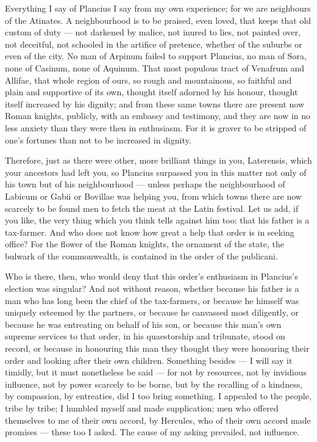  Everything I say of Plancius I say from my own experience; for we are neighbours of the Atinates. A neighbourhood is to be praised, even loved, that keeps that old custom of duty --- not darkened by malice, not inured to lies, not painted over, not deceitful, not schooled in the artifice of pretence, whether of the suburbs or even of the city. No man of Arpinum failed to support Plancius, no man of Sora, none of Casinum, none of Aquinum. That most populous tract of Venafrum and Allifae, that whole region of ours, so rough and mountainous, so faithful and plain and supportive of its own, thought itself adorned by his honour, thought itself increased by his dignity; and from these same towns there are present now Roman knights, publicly, with an embassy and testimony, and they are now in no less anxiety than they were then in enthusiasm. For it is graver to be stripped of one's fortunes than not to be increased in dignity.

 Therefore, just as there were other, more brilliant things in you, Laterensis, which your ancestors had left you, so Plancius surpassed you in this matter not only of his town but of his neighbourhood --- unless perhaps the neighbourhood of Labicum or Gabii or Bovillae was helping you, from which towns there are now scarcely to be found men to fetch the meat at the Latin festival. Let us add, if you like, the very thing which you think tells against him too: that his father is a tax-farmer. And who does not know how great a help that order is in seeking office? For the flower of the Roman knights, the ornament of the state, the bulwark of the commonwealth, is contained in the order of the publicani.

 Who is there, then, who would deny that this order's enthusiasm in Plancius's election was singular? And not without reason, whether because his father is a man who has long been the chief of the tax-farmers, or because he himself was uniquely esteemed by the partners, or because he canvassed most diligently, or because he was entreating on behalf of his son, or because this man's own supreme services to that order, in his quaestorship and tribunate, stood on record, or because in honouring this man they thought they were honouring their order and looking after their own children. Something besides --- I will say it timidly, but it must nonetheless be said --- for not by resources, not by invidious influence, not by power scarcely to be borne, but by the recalling of a kindness, by compassion, by entreaties, did I too bring something. I appealed to the people, tribe by tribe; I humbled myself and made supplication; men who offered themselves to me of their own accord, by Hercules, who of their own accord made promises --- these too I asked. The cause of my asking prevailed, not influence.

